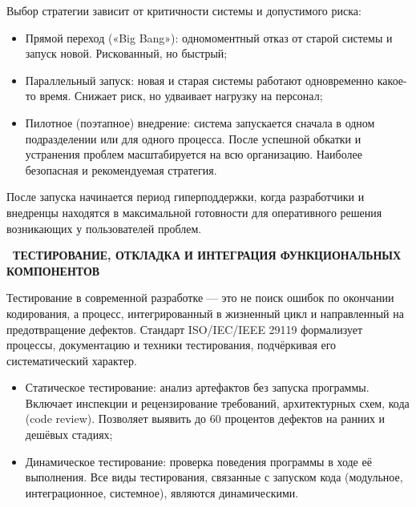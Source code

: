 \documentclass{SibFU-docs}
\begin{document}

Выбор стратегии зависит от критичности системы и допустимого риска:

\begin{itemize}[label=-]
    \item Прямой переход («Big Bang»): одномоментный отказ от старой системы и запуск новой. Рискованный, но быстрый;
    \item Параллельный запуск: новая и старая системы работают одновременно какое-то время. Снижает риск, но удваивает нагрузку на персонал;
    \item Пилотное (поэтапное) внедрение: система запускается сначала в одном подразделении или для одного процесса. После успешной обкатки и устранения проблем масштабируется на всю организацию. Наиболее безопасная и рекомендуемая стратегия.
\end{itemize}

После запуска начинается период гиперподдержки, когда разработчики и внедренцы находятся в максимальной готовности для оперативного решения возникающих у пользователей проблем. \cite{pressman2014se}



\newpage
{}
\begin{center}\textbf{\thesection\ ТЕСТИРОВАНИЕ, ОТКЛАДКА И ИНТЕГРАЦИЯ ФУНКЦИОНАЛЬНЫХ КОМПОНЕНТОВ}\end{center}
\vspace*{-1.5em}


Тестирование в современной разработке — это не поиск ошибок по окончании кодирования, а процесс, интегрированный в жизненный цикл и направленный на предотвращение дефектов. Стандарт ISO/IEC/IEEE 29119 формализует процессы, документацию и техники тестирования, подчёркивая его систематический характер.


\begin{itemize}[label=-]
    \item Статическое тестирование: анализ артефактов без запуска программы. Включает инспекции и рецензирование требований, архитектурных схем, кода (code review). Позволяет выявить до 60 процентов дефектов на ранних и дешёвых стадиях;
    \item Динамическое тестирование: проверка поведения программы в ходе её выполнения. Все виды тестирования, связанные с запуском кода (модульное, интеграционное, системное), являются динамическими.
\end{itemize}
\end{document}
